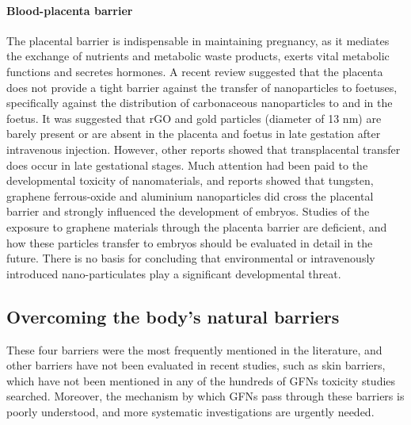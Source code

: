 \documentclass[twoside,twocolumn,9pt]{article}
\begin{document}
\paragraph{Blood-placenta barrier}The placental barrier is indispensable in maintaining pregnancy, as it mediates the exchange of nutrients and metabolic waste products, exerts vital metabolic functions and secretes hormones. A recent review suggested that the placenta does not provide a tight barrier against the transfer of nanoparticles to foetuses, specifically against the distribution of carbonaceous nanoparticles to and in the foetus. It was suggested that rGO and gold particles (diameter of 13 nm) are barely present or are absent in the placenta and foetus in late gestation after intravenous injection. However, other reports showed that transplacental transfer does occur in late gestational stages. Much attention had been paid to the developmental toxicity of nanomaterials, and reports showed that tungsten, graphene ferrous-oxide and aluminium nanoparticles did cross the placental barrier and strongly influenced the development of embryos. Studies of the exposure to graphene materials through the placenta barrier are deficient, and how these particles transfer to embryos should be evaluated in detail in the future. There is no basis for concluding that environmental or intravenously introduced nano-particulates play a significant developmental threat.

\subsection{Overcoming the body's natural barriers}
These four barriers were the most frequently mentioned in the literature, and other barriers have not been evaluated in recent studies, such as skin barriers, which have not been mentioned in any of the hundreds of GFNs toxicity studies searched. Moreover, the mechanism by which GFNs pass through these barriers is poorly understood, and more systematic investigations are urgently needed.
\end{document}

